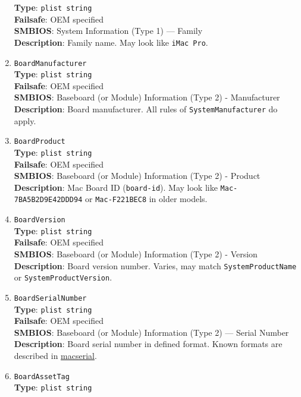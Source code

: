 \documentclass[]{article}
\begin{document}
\begin{enumerate}
  \textbf{Type}: \texttt{plist\ string}\\
  \textbf{Failsafe}: OEM specified\\
  \textbf{SMBIOS}: System Information (Type 1) --- Family\\
  \textbf{Description}: Family name. May look like \texttt{iMac\ Pro}.
\item
  \texttt{BoardManufacturer}\\
  \textbf{Type}: \texttt{plist\ string}\\
  \textbf{Failsafe}: OEM specified\\
  \textbf{SMBIOS}: Baseboard (or Module) Information (Type 2) -
  Manufacturer\\
  \textbf{Description}: Board manufacturer. All rules of
  \texttt{SystemManufacturer} do apply.
\item
  \texttt{BoardProduct}\\
  \textbf{Type}: \texttt{plist\ string}\\
  \textbf{Failsafe}: OEM specified\\
  \textbf{SMBIOS}: Baseboard (or Module) Information (Type 2) -
  Product\\
  \textbf{Description}: Mac Board ID (\texttt{board-id}). May look like
  \texttt{Mac-7BA5B2D9E42DDD94} or \texttt{Mac-F221BEC8} in older
  models.
\item
  \texttt{BoardVersion}\\
  \textbf{Type}: \texttt{plist\ string}\\
  \textbf{Failsafe}: OEM specified\\
  \textbf{SMBIOS}: Baseboard (or Module) Information (Type 2) -
  Version\\
  \textbf{Description}: Board version number. Varies, may match
  \texttt{SystemProductName} or \texttt{SystemProductVersion}.
\item
  \texttt{BoardSerialNumber}\\
  \textbf{Type}: \texttt{plist\ string}\\
  \textbf{Failsafe}: OEM specified\\
  \textbf{SMBIOS}: Baseboard (or Module) Information (Type 2) --- Serial
  Number\\
  \textbf{Description}: Board serial number in defined format. Known
  formats are described in
  \href{https://github.com/acidanthera/macserial/blob/master/FORMAT.md}{macserial}.
\item
  \texttt{BoardAssetTag}\\
  \textbf{Type}: \texttt{plist\ string}\\

\end{enumerate}
\end{document}
